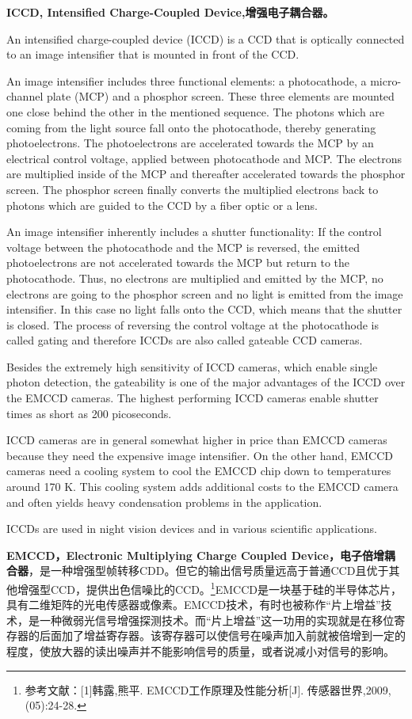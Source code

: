 \textbf{ICCD, Intensified Charge-Coupled Device,增强电子耦合器。}

An intensified charge-coupled device (ICCD) is a CCD that is optically connected to an image intensifier that is mounted in front of the CCD.

An image intensifier includes three functional elements: a photocathode, a micro-channel plate (MCP) and a phosphor screen. These three elements are mounted one close behind the other in the mentioned sequence. The photons which are coming from the light source fall onto the photocathode, thereby generating photoelectrons. The photoelectrons are accelerated towards the MCP by an electrical control voltage, applied between photocathode and MCP. The electrons are multiplied inside of the MCP and thereafter accelerated towards the phosphor screen. The phosphor screen finally converts the multiplied electrons back to photons which are guided to the CCD by a fiber optic or a lens.

An image intensifier inherently includes a shutter functionality: If the control voltage between the photocathode and the MCP is reversed, the emitted photoelectrons are not accelerated towards the MCP but return to the photocathode. Thus, no electrons are multiplied and emitted by the MCP, no electrons are going to the phosphor screen and no light is emitted from the image intensifier. In this case no light falls onto the CCD, which means that the shutter is closed. The process of reversing the control voltage at the photocathode is called gating and therefore ICCDs are also called gateable CCD cameras.

Besides the extremely high sensitivity of ICCD cameras, which enable single photon detection, the gateability is one of the major advantages of the ICCD over the EMCCD cameras. The highest performing ICCD cameras enable shutter times as short as 200 picoseconds.

ICCD cameras are in general somewhat higher in price than EMCCD cameras because they need the expensive image intensifier. On the other hand, EMCCD cameras need a cooling system to cool the EMCCD chip down to temperatures around 170 K. This cooling system adds additional costs to the EMCCD camera and often yields heavy condensation problems in the application.

ICCDs are used in night vision devices and in various scientific applications.


\textbf{EMCCD，Electronic Multiplying Charge Coupled Device，电子倍增耦合器}，是一种增强型帧转移CDD。但它的输出信号质量远高于普通CCD且优于其他增强型CCD，提供出色信噪比的CCD。\footnote{参考文献：[1]韩露,熊平. EMCCD工作原理及性能分析[J]. 传感器世界,2009,(05):24-28.}EMCCD是一块基于硅的半导体芯片，具有二维矩阵的光电传感器或像素。EMCCD技术，有时也被称作“片上增益”技术，是一种微弱光信号增强探测技术。而“片上增益”这一功用的实现就是在移位寄存器的后面加了增益寄存器。该寄存器可以使信号在噪声加入前就被倍增到一定的程度，使放大器的读出噪声并不能影响信号的质量，或者说减小对信号的影响。


